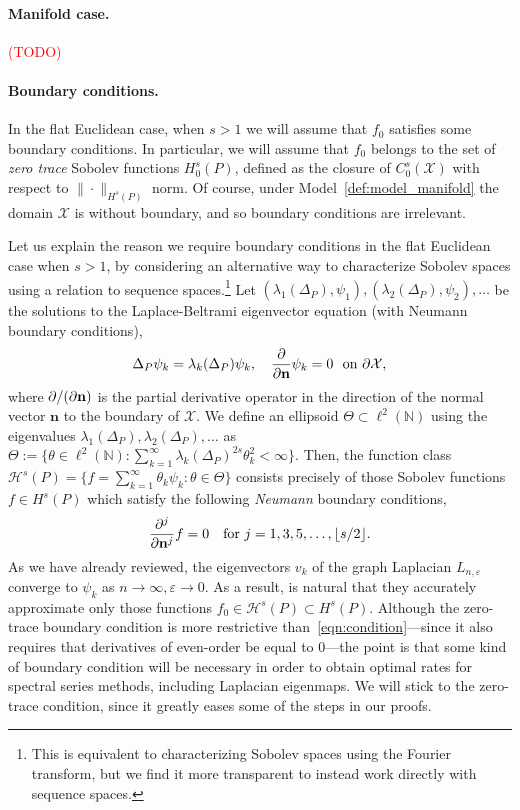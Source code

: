 \documentclass{article}
\newcommand{\floor}[1]{\left\lfloor #1 \right\rfloor}
\newcommand{\1}{\mathbf{1}}
\newcommand{\mc}[1]{\mathcal{#1}}
\theoremstyle{alden}
\theoremstyle{aldenthm}
\theoremstyle{definition}
\theoremstyle{remark}
\begin{document}
\paragraph{Manifold case.}

\textcolor{red}{(TODO)}

\paragraph{Boundary conditions.}
In the flat Euclidean case, when $s > 1$ we will assume that $f_0$ satisfies some boundary conditions. In particular, we will assume that $f_0$ belongs to the set of \emph{zero trace} Sobolev functions $H_0^{s}(P)$, defined as the closure of $C_0^s(\mc{X})$ with respect to $\|\cdot\|_{H^s(P)}$ norm. Of course, under Model~\ref{def:model_manifold} the domain $\mc{X}$ is without boundary, and so boundary conditions are irrelevant.

Let us explain the reason we require boundary conditions in the flat Euclidean case when $s > 1$, by considering an alternative way to characterize Sobolev spaces using a relation to sequence spaces.\footnote{This is equivalent to characterizing Sobolev spaces using the Fourier transform, but we find it more transparent to instead work directly with sequence spaces.} Let $(\lambda_1(\Delta_P),\psi_1),(\lambda_2(\Delta_P),\psi_2),\ldots$ be the solutions to the Laplace-Beltrami eigenvector equation (with Neumann boundary conditions), 
\begin{equation*}
\Delta_P\psi_k = \lambda_{k}(\Delta_P) \psi_k, \quad \frac{\partial}{\partial {\bf n}}\psi_k = 0~~\textrm{on $\partial \mc{X}$},
\end{equation*}
where $\partial/(\partial {\bf n})$ is the partial derivative operator in the direction of the normal vector $\mathbf{n}$ to the boundary of $\mc{X}$.
We define an ellipsoid $\Theta \subset \ell^2(\mathbb{N})$  using the eigenvalues $\lambda_1(\Delta_P),\lambda_2(\Delta_P),\ldots$ as $\Theta := \{\theta \in \ell^2(\mathbb{N}): \sum_{k = 1}^{\infty} \lambda_k(\Delta_P)^{2s} \theta_k^2 < \infty\}$. Then, the function class $\mc{H}^s(P) = \{f = \sum_{k = 1}^{\infty} \theta_k \psi_k: \theta \in \Theta\}$ consists precisely of those Sobolev functions $f \in H^s(P)$ which satisfy the following \emph{Neumann} boundary conditions,
\begin{equation}
\label{eqn:condition}
\frac{\partial^j}{\partial {\bf n}^j}f = 0 \quad \textrm{for $j = 1,3,5,\ldots,\floor{s/2}$.}
\end{equation}
As we have already reviewed, the eigenvectors $v_k$ of the graph Laplacian $L_{n,\varepsilon}$ converge to $\psi_k$ as $n \to \infty, \varepsilon \to 0$. As a result, is natural that they accurately approximate only those functions $f_0 \in \mc{H}^s(P) \subset H^s(P)$. Although the zero-trace boundary condition is more restrictive than~\eqref{eqn:condition}---since it also requires that derivatives of even-order be equal to $0$---the point is that some kind of boundary condition will be necessary in order to obtain optimal rates for spectral series methods, including Laplacian eigenmaps. We will stick to the zero-trace condition, since it greatly eases some of the steps in our proofs.
\end{document}
